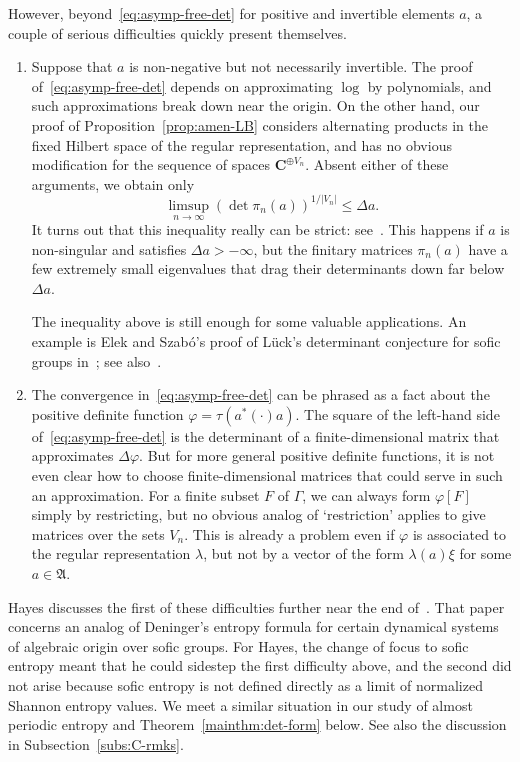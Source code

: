 \documentclass[12pt,a4paper]{article}
\numberwithin{equation}{section}
\theoremstyle{remark}
\newcommand{\bbC}{\mathbf{C}}
\newcommand{\A}{\mathfrak{A}}
\newcommand{\G}{\Gamma}
\renewcommand{\phi}{\varphi}
\renewcommand{\l}{\lambda}
\begin{document}
However, beyond~\eqref{eq:asymp-free-det} for positive and invertible elements $a$, a couple of serious difficulties quickly present themselves.
\begin{enumerate}
\item Suppose that $a$ is non-negative but not necessarily invertible.  The proof of~\eqref{eq:asymp-free-det} depends on approximating $\log$ by polynomials, and such approximations break down near the origin.  On the other hand, our proof of Proposition~\ref{prop:amen-LB} considers alternating products in the fixed Hilbert space of the regular representation, and has no obvious modification for the sequence of spaces $\bbC^{\oplus V_n}$.  Absent either of these arguments, we obtain only
\[\limsup_{n\to\infty}(\det \pi_n(a))^{1/|V_n|} \le \Delta a.
\]
It turns out that this inequality really can be strict: see~\cite[Ex. 13.69]{Luc02}.  This happens if $a$ is non-singular and satisfies $\Delta a > -\infty$, but the finitary matrices $\pi_n(a)$ have a few extremely small eigenvalues that drag their determinants down far below $\Delta a$.

The inequality above is still enough for some valuable applications.  An example is Elek and Szab\'o's proof of L\"uck's determinant conjecture for sofic groups in~\cite{EleSza05}; see also~\cite{BalSka16}.

\item The convergence in~\eqref{eq:asymp-free-det} can be phrased as a fact about the positive definite function $\phi = \tau(a^\ast(\cdot)a)$.  The square of the left-hand side of~\eqref{eq:asymp-free-det} is the determinant of a finite-dimensional matrix that approximates $\Delta \phi$.  But for more general positive definite functions, it is not even clear how to choose finite-dimensional matrices that could serve in such an approximation.  For a finite subset $F$ of $\G$, we can always form $\phi[F]$ simply by restricting, but no obvious analog of `restriction' applies to give matrices over the sets $V_n$.  This is already a problem even if $\phi$ is associated to the regular representation $\l$, but not by a vector of the form $\l(a)\xi$ for some $a \in \A$.
\end{enumerate}

Hayes discusses the first of these difficulties further near the end of~\cite[Intro.]{Hayes16}.  That paper concerns an analog of Deninger's entropy formula for certain dynamical systems of algebraic origin over sofic groups.  For Hayes, the change of focus to sofic entropy meant that he could sidestep the first difficulty above, and the second did not arise because sofic entropy is not defined directly as a limit of normalized Shannon entropy values.  We meet a similar situation in our study of almost periodic entropy and Theorem~\ref{mainthm:det-form} below.  See also the discussion in Subsection~\ref{subs:C-rmks}.
\end{document}
